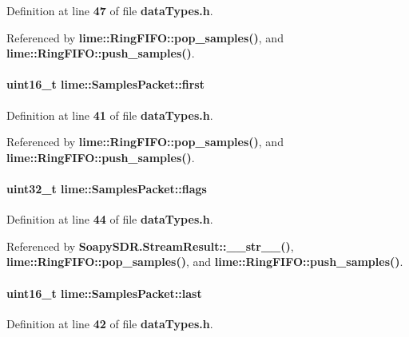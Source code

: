 Definition at line {\bf 47} of file {\bf data\+Types.\+h}.



Referenced by {\bf lime\+::\+Ring\+F\+I\+F\+O\+::pop\+\_\+samples()}, and {\bf lime\+::\+Ring\+F\+I\+F\+O\+::push\+\_\+samples()}.

\paragraph[{first}]{\setlength{\rightskip}{0pt plus 5cm}uint16\+\_\+t lime\+::\+Samples\+Packet\+::first}\label{classlime_1_1SamplesPacket_a14c74a179ffb3fce0bb36e56ff7fc19d}


Definition at line {\bf 41} of file {\bf data\+Types.\+h}.



Referenced by {\bf lime\+::\+Ring\+F\+I\+F\+O\+::pop\+\_\+samples()}, and {\bf lime\+::\+Ring\+F\+I\+F\+O\+::push\+\_\+samples()}.

\paragraph[{flags}]{\setlength{\rightskip}{0pt plus 5cm}uint32\+\_\+t lime\+::\+Samples\+Packet\+::flags}\label{classlime_1_1SamplesPacket_a0bc798bc95c2767260cfd04d85ef19a5}


Definition at line {\bf 44} of file {\bf data\+Types.\+h}.



Referenced by {\bf Soapy\+S\+D\+R.\+Stream\+Result\+::\+\_\+\+\_\+str\+\_\+\+\_\+()}, {\bf lime\+::\+Ring\+F\+I\+F\+O\+::pop\+\_\+samples()}, and {\bf lime\+::\+Ring\+F\+I\+F\+O\+::push\+\_\+samples()}.

\paragraph[{last}]{\setlength{\rightskip}{0pt plus 5cm}uint16\+\_\+t lime\+::\+Samples\+Packet\+::last}\label{classlime_1_1SamplesPacket_a813a9aa876fc3cb5f838bdad5b0ad204}


Definition at line {\bf 42} of file {\bf data\+Types.\+h}.




